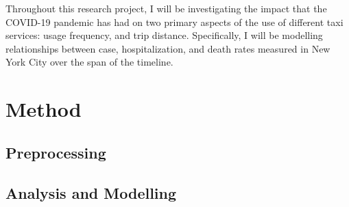 \documentclass[11pt]{article}
\begin{document}
Throughout this research project, 
I will be investigating the impact that the COVID-19 pandemic has had on two primary aspects of the use of different taxi services:
usage frequency, and trip distance. Specifically, I will be modelling relationships between case, hospitalization, and death rates measured in New York City over the span of the timeline.





\section{Method}

\subsection{Preprocessing}

\subsection{Analysis and Modelling}
\end{document}
